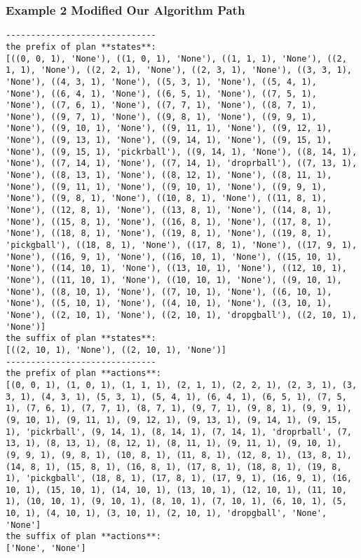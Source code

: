 \subsubsection{Example 2 Modified Our Algorithm Path}
\begin{lstlisting}
------------------------------
the prefix of plan **states**:
[((0, 0, 1), 'None'), ((1, 0, 1), 'None'), ((1, 1, 1), 'None'), ((2, 1, 1), 'None'), ((2, 2, 1), 'None'), ((2, 3, 1), 'None'), ((3, 3, 1), 'None'), ((4, 3, 1), 'None'), ((5, 3, 1), 'None'), ((5, 4, 1), 'None'), ((6, 4, 1), 'None'), ((6, 5, 1), 'None'), ((7, 5, 1), 'None'), ((7, 6, 1), 'None'), ((7, 7, 1), 'None'), ((8, 7, 1), 'None'), ((9, 7, 1), 'None'), ((9, 8, 1), 'None'), ((9, 9, 1), 'None'), ((9, 10, 1), 'None'), ((9, 11, 1), 'None'), ((9, 12, 1), 'None'), ((9, 13, 1), 'None'), ((9, 14, 1), 'None'), ((9, 15, 1), 'None'), ((9, 15, 1), 'pickrball'), ((9, 14, 1), 'None'), ((8, 14, 1), 'None'), ((7, 14, 1), 'None'), ((7, 14, 1), 'droprball'), ((7, 13, 1), 'None'), ((8, 13, 1), 'None'), ((8, 12, 1), 'None'), ((8, 11, 1), 'None'), ((9, 11, 1), 'None'), ((9, 10, 1), 'None'), ((9, 9, 1), 'None'), ((9, 8, 1), 'None'), ((10, 8, 1), 'None'), ((11, 8, 1), 'None'), ((12, 8, 1), 'None'), ((13, 8, 1), 'None'), ((14, 8, 1), 'None'), ((15, 8, 1), 'None'), ((16, 8, 1), 'None'), ((17, 8, 1), 'None'), ((18, 8, 1), 'None'), ((19, 8, 1), 'None'), ((19, 8, 1), 'pickgball'), ((18, 8, 1), 'None'), ((17, 8, 1), 'None'), ((17, 9, 1), 'None'), ((16, 9, 1), 'None'), ((16, 10, 1), 'None'), ((15, 10, 1), 'None'), ((14, 10, 1), 'None'), ((13, 10, 1), 'None'), ((12, 10, 1), 'None'), ((11, 10, 1), 'None'), ((10, 10, 1), 'None'), ((9, 10, 1), 'None'), ((8, 10, 1), 'None'), ((7, 10, 1), 'None'), ((6, 10, 1), 'None'), ((5, 10, 1), 'None'), ((4, 10, 1), 'None'), ((3, 10, 1), 'None'), ((2, 10, 1), 'None'), ((2, 10, 1), 'dropgball'), ((2, 10, 1), 'None')]
the suffix of plan **states**:
[((2, 10, 1), 'None'), ((2, 10, 1), 'None')]
------------------------------
the prefix of plan **actions**:
[(0, 0, 1), (1, 0, 1), (1, 1, 1), (2, 1, 1), (2, 2, 1), (2, 3, 1), (3, 3, 1), (4, 3, 1), (5, 3, 1), (5, 4, 1), (6, 4, 1), (6, 5, 1), (7, 5, 1), (7, 6, 1), (7, 7, 1), (8, 7, 1), (9, 7, 1), (9, 8, 1), (9, 9, 1), (9, 10, 1), (9, 11, 1), (9, 12, 1), (9, 13, 1), (9, 14, 1), (9, 15, 1), 'pickrball', (9, 14, 1), (8, 14, 1), (7, 14, 1), 'droprball', (7, 13, 1), (8, 13, 1), (8, 12, 1), (8, 11, 1), (9, 11, 1), (9, 10, 1), (9, 9, 1), (9, 8, 1), (10, 8, 1), (11, 8, 1), (12, 8, 1), (13, 8, 1), (14, 8, 1), (15, 8, 1), (16, 8, 1), (17, 8, 1), (18, 8, 1), (19, 8, 1), 'pickgball', (18, 8, 1), (17, 8, 1), (17, 9, 1), (16, 9, 1), (16, 10, 1), (15, 10, 1), (14, 10, 1), (13, 10, 1), (12, 10, 1), (11, 10, 1), (10, 10, 1), (9, 10, 1), (8, 10, 1), (7, 10, 1), (6, 10, 1), (5, 10, 1), (4, 10, 1), (3, 10, 1), (2, 10, 1), 'dropgball', 'None', 'None']
the suffix of plan **actions**:
['None', 'None']
\end{lstlisting}

\endgroup
